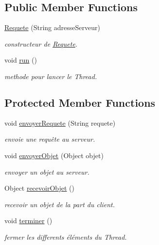 \subsection*{Public Member Functions}
\begin{DoxyCompactItemize}
\item 
\hyperlink{classrequete_1_1Requete_a6ed8eefb9335b37f2348f5c323a46b53}{Requete} (String adresse\+Serveur)
\begin{DoxyCompactList}\small\item\em constructeur de \hyperlink{classrequete_1_1Requete}{Requete}. \end{DoxyCompactList}\item 
\mbox{\label{classrequete_1_1Requete_a919081397ea25302286d7077e3ece323}} 
void \hyperlink{classrequete_1_1Requete_a919081397ea25302286d7077e3ece323}{run} ()
\begin{DoxyCompactList}\small\item\em methode pour lancer le Thread. \end{DoxyCompactList}\end{DoxyCompactItemize}
\subsection*{Protected Member Functions}
\begin{DoxyCompactItemize}
\item 
void \hyperlink{classrequete_1_1Requete_a4adc60edaa26be2f8d9b4e4b0a1377cd}{envoyer\+Requete} (String requete)
\begin{DoxyCompactList}\small\item\em envoie une requête au serveur. \end{DoxyCompactList}\item 
void \hyperlink{classrequete_1_1Requete_a4c463c0668c443e22d413d788b612794}{envoyer\+Objet} (Object objet)
\begin{DoxyCompactList}\small\item\em envoyer un objet au serveur. \end{DoxyCompactList}\item 
Object \hyperlink{classrequete_1_1Requete_a8aeabe00174a3542c9d6bbc940495e04}{recevoir\+Objet} ()
\begin{DoxyCompactList}\small\item\em recevoir un objet de la part du client. \end{DoxyCompactList}\item 
\mbox{\label{classrequete_1_1Requete_a139183d42763866d351b3569c858b169}} 
void \hyperlink{classrequete_1_1Requete_a139183d42763866d351b3569c858b169}{terminer} ()
\begin{DoxyCompactList}\small\item\em fermer les differents éléments du Thread. \end{DoxyCompactList}\end{DoxyCompactItemize}
